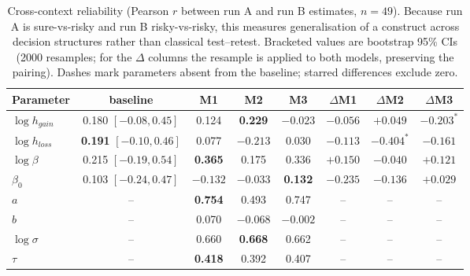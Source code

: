 \documentclass[11pt,a4paper]{article}
\begin{document}
\begin{table}[H]\centering
\caption{Cross-context reliability (Pearson $r$ between run A and run B estimates, $n=49$).
Because run A is sure-vs-risky and run B risky-vs-risky, this measures generalisation of a
construct across decision structures rather than classical test--retest. Bracketed values are
bootstrap 95\% CIs (2000 resamples; for the $\Delta$ columns the resample is applied to both
models, preserving the pairing). Dashes mark parameters absent from the baseline; starred
differences exclude zero.}
\label{tab:reliability}
\small
\begin{tabular}{lccccccc}
\toprule
Parameter & baseline & M1 & M2 & M3 & $\Delta$M1 & $\Delta$M2 & $\Delta$M3\\
\midrule
$\log h_{gain}$ & 0.180 $[-0.08,0.45]$ & 0.124 & \textbf{0.229} & $-0.023$ & $-0.056$ & $+0.049$ & $-0.203^{*}$\\
$\log h_{loss}$ & \textbf{0.191} $[-0.10,0.46]$ & 0.077 & $-0.213$ & 0.030 & $-0.113$ & $-0.404^{*}$ & $-0.161$\\
$\log\beta$     & 0.215 $[-0.19,0.54]$ & \textbf{0.365} & 0.175 & 0.336 & $+0.150$ & $-0.040$ & $+0.121$\\
$\beta_0$       & 0.103 $[-0.24,0.47]$ & $-0.132$ & $-0.033$ & \textbf{0.132} & $-0.235$ & $-0.136$ & $+0.029$\\
$a$             & --    & \textbf{0.754} & 0.493 & 0.747 & -- & -- & --\\
$b$             & --    & 0.070 & $-0.068$ & $-0.002$ & -- & -- & --\\
$\log\sigma$    & --    & 0.660 & \textbf{0.668} & 0.662 & -- & -- & --\\
$\tau$          & --    & \textbf{0.418} & 0.392 & 0.407 & -- & -- & --\\
\bottomrule
\end{tabular}
\end{table}
\end{document}
